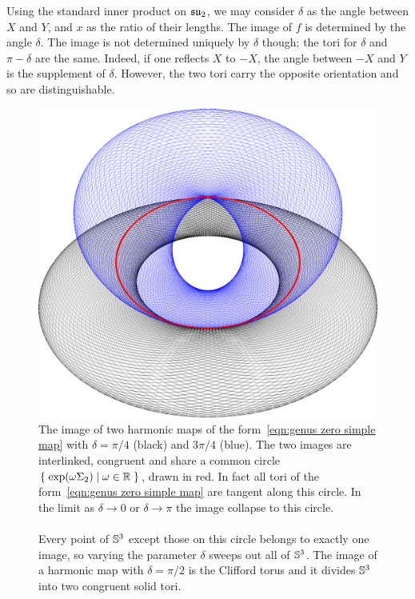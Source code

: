 \documentclass{article}
\begin{document}
Using the standard inner product on $\su_2$, we may consider $\delta$ as the angle between $X$ and $Y$, and $x$ as the ratio of their lengths. The image of $f$ is determined by the angle $\delta$. The image is not determined uniquely by $\delta$ though; the tori for $\delta$ and $\pi-\delta$ are the same. Indeed, if one reflects $X$ to $-X$, the angle between $-X$ and $Y$ is the supplement of $\delta$. However, the two tori carry the opposite orientation and so are distinguishable.

\begin{figure}
\includegraphics[width=\textwidth]{graphics/genus0_linked.png}
\caption{The image of two harmonic maps of the form~\eqref{eqn:genus zero simple map} with $\delta=\pi/4$ (black) and $3\pi/4$ (blue). The two images are interlinked, congruent and share a common circle $\Set{\exp(\omega \Sigma_2)}{\omega \in \R}$, drawn in red. In fact all tori of the form~\eqref{eqn:genus zero simple map} are tangent along this circle. In the limit as $\delta \to 0$ or $\delta \to \pi$ the image collapse to this circle. \\
~\\
Every point of $\S^3$ except those on this circle belongs to exactly one image, so varying the parameter $\delta$ sweeps out all of $\S^3$.
The image of a harmonic map with $\delta=\pi/2$ is the Clifford torus and it divides $\S^3$ into two congruent solid tori.}
\label{fig:genus0 linked}
\end{figure}
\end{document}
